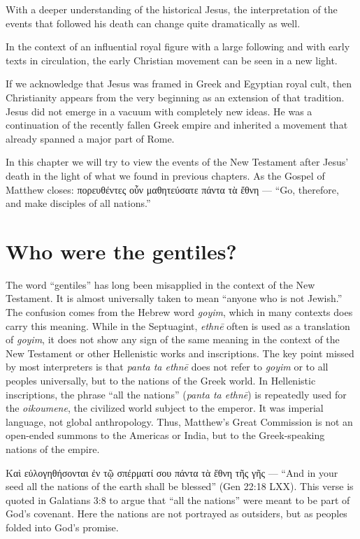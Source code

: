 With a deeper understanding of the historical Jesus, the interpretation of the events that followed his death can change quite dramatically as well.

In the context of an influential royal figure with a large following and with early texts in circulation, the early Christian movement can be seen in a new light.

If we acknowledge that Jesus was framed in Greek and Egyptian royal cult, then Christianity appears from the very beginning as an extension of that tradition.
Jesus did not emerge in a vacuum with completely new ideas.
He was a continuation of the recently fallen Greek empire and inherited a movement that already spanned a major part of Rome.

In this chapter we will try to view the events of the New Testament after Jesus’ death in the light of what we found in previous chapters.
As the Gospel of Matthew closes: πορευθέντες οὖν μαθητεύσατε πάντα τὰ ἔθνη — “Go, therefore, and make disciples of all nations.”

\section{Who were the gentiles?}\label{sec:who-were-the-gentiles}

The word “gentiles” has long been misapplied in the context of the New Testament.
It is almost universally taken to mean “anyone who is not Jewish.”
The confusion comes from the Hebrew word \textit{goyim}, which in many contexts does carry this meaning.
While in the Septuagint, \textit{ethnē} often is used as a translation of \textit{goyim}, it does not show any sign of the same meaning in the context of the New Testament or other Hellenistic works and inscriptions.
The key point missed by most interpreters is that \textit{panta ta ethnē} does not refer to \textit{goyim} or to all peoples universally, but to the nations of the Greek world.
In Hellenistic inscriptions, the phrase “all the nations” (\textit{panta ta ethnē}) is repeatedly used for the \textit{oikoumene}, the civilized world subject to the emperor.
It was imperial language, not global anthropology.
Thus, Matthew’s Great Commission is not an open-ended summons to the Americas or India, but to the Greek-speaking nations of the empire.

Καὶ εὐλογηθήσονται ἐν τῷ σπέρματί σου πάντα τὰ ἔθνη τῆς γῆς — “And in your seed all the nations of the earth shall be blessed” (Gen 22:18 LXX).
This verse is quoted in Galatians 3:8 to argue that “all the nations” were meant to be part of God’s covenant.
Here the nations are not portrayed as outsiders, but as peoples folded into God’s promise.

